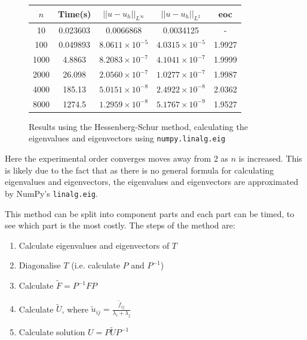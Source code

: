 \documentclass{article}
\numberwithin{equation}{section}
\begin{document}
\begin{figure}
\begin{table}[H]
\centering
\begin{tabular}{|c|c|c|c|c|}
\hline
$n$ & Time(s) & $|| u - u_h ||_{L^{\infty}}$ &$|| u - u_h ||_{L^{2}}$ & eoc \\
\hline
10 & 0.023603 & 0.0066868 & 0.0034125 & - \\
100 & 0.049893 & $8.0611 \times 10^{-5}$ & $4.0315 \times 10^{-5}$ & 1.9927  \\ 
1000 & 4.8863 & $8.2083 \times 10^{-7}$ & $4.1041 \times 10^{-7}$ & 1.9999  \\
2000 & 26.098 & $2.0560 \times 10^{-7}$ & $1.0277 \times 10^{-7}$ & 1.9987 \\
4000 & 185.13 & $5.0151 \times 10^{-8}$ & $2.4922 \times 10^{-8}$ & 2.0362 \\
8000 & 1274.5 & $1.2959 \times 10^{-8}$ & $5.1767 \times 10^{-9}$ & 1.9527 \\
\hline
\end{tabular}
\end{table}
\caption{Results using the Hessenberg-Schur method, calculating the eigenvalues and eigenvectors using \texttt{numpy.linalg.eig}}
\end{figure}

Here the experimental order converges moves away from 2 as $n$ is increased. This is likely due to the fact that as there is no general formula for calculating eigenvalues and eigenvectors, the eigenvalues and eigenvectors are approximated by NumPy's \texttt{linalg.eig}.

This method can be split into component parts and each part can be timed, to see which part is the most costly. The steps of the method are:
\begin{enumerate}
\item Calculate eigenvalues and eigenvectors of $T$
\item Diagonalise $T$ (i.e. calculate $P$ and $P^{-1}$)
\item Calculate $\tilde{F}=P^{-1}FP$
\item Calculate $\tilde{U}$, where $\tilde{u}_{ij} = \frac{\tilde{f}_{ij}}{\lambda_i + \lambda_j}$
\item Calculate solution $U=P \tilde{U}P^{-1}$
\end{enumerate}
\end{document}
